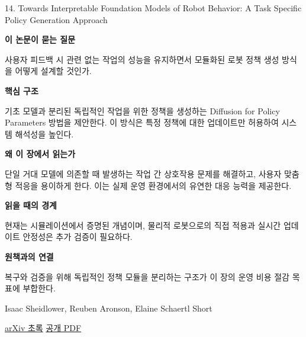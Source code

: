 \documentclass[11pt,openany]{book}
\begin{document}
\begin{termcard}{14. Towards Interpretable Foundation Models of Robot Behavior: A Task Specific Policy Generation Approach}

\par

\medskip

{\sffamily\bfseries\color{deepblue} 이 논문이 묻는 질문}\par

사용자 피드백 시 관련 없는 작업의 성능을 유지하면서 모듈화된 로봇 정책 생성 방식을 어떻게 설계할 것인가.

\smallskip

{\sffamily\bfseries\color{deepblue} 핵심 구조}\par

기초 모델과 분리된 독립적인 작업을 위한 정책을 생성하는 Diffusion for Policy Parameters 방법을 제안한다. 이 방식은 특정 정책에 대한 업데이트만 허용하여 시스템 해석성을 높인다.

\smallskip

{\sffamily\bfseries\color{deepblue} 왜 이 장에서 읽는가}\par

단일 거대 모델에 의존할 때 발생하는 작업 간 상호작용 문제를 해결하고, 사용자 맞춤형 적응을 용이하게 한다. 이는 실제 운영 환경에서의 유연한 대응 능력을 제공한다.

\smallskip

{\sffamily\bfseries\color{coral} 읽을 때의 경계}\par

현재는 시뮬레이션에서 증명된 개념이며, 물리적 로봇으로의 직접 적용과 실시간 업데이트 안정성은 추가 검증이 필요하다.

\smallskip

{\sffamily\bfseries\color{teal} 원책과의 연결}\par

복구와 검증을 위해 독립적인 정책 모듈을 분리하는 구조가 이 장의 운영 비용 절감 목표에 부합한다.

\medskip

{\footnotesize\color{muted} Isaac Sheidlower, Reuben Aronson, Elaine Schaertl Short\par

\href{https://arxiv.org/abs/2407.08065}{arXiv 초록} \quad \href{https://arxiv.org/pdf/2407.08065}{공개 PDF}\par}

\end{termcard}
\end{document}

